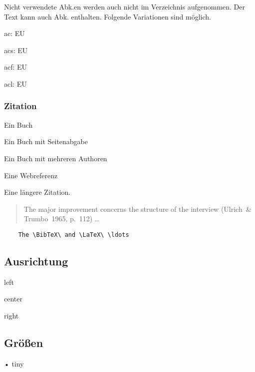 Nicht verwendete \ac{Abk.}en werden auch nicht im Verzeichnis aufgenommen. Der Text kann auch \ac{Abk.} enthalten. Folgende Variationen sind möglich.\par
ac: \ac{EU}\par
acs: \acs{EU}\par
acf: \acf{EU}\par
acl: \acl{EU}\par

\subsubsection{Zitation}\label{sssec:citation}

Ein Buch \cite{b:buch}\par
Ein Buch mit Seitenabgabe \cite[S. 3ff.]{b:latex}\par
Ein Buch mit mehreren Authoren \cite{b:komascript}\par
Eine Webreferenz \cite{w:website}\par
Eine längere Zitation.\par
\begin{quote}
	The major improvement concerns the structure of the interview
	(Ulrich~\& Trumbo~1965, p.~112) \ldots \par
	\blindtext
\end{quote}

\begin{verbatim}
	The \BibTeX\ and \LaTeX\ \ldots
\end{verbatim}

\subsection{Ausrichtung}\label{ssec:ausrichtung}

\begin{flushleft}
left
\end{flushleft}

\begin{center}
center
\end{center}

\begin{flushright}
right
\end{flushright}

\subsection{Grö{\ss}en}\label{ssec:groessen}

\begin{tiny}
• tiny
\end{tiny}

